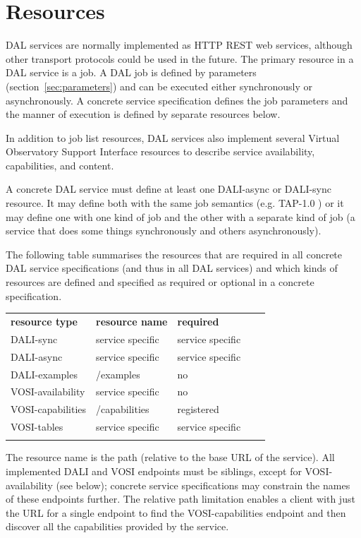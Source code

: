 \documentclass[11pt,letter]{ivoa}
\begin{document}
\section{Resources}
\label{sec:resources}
DAL services are normally implemented as HTTP REST \citep{fielding00} 
web services, although 
other transport protocols could be used in the future. The primary resource in 
a DAL service is a job. A DAL job is defined by parameters 
(section~\ref{sec:parameters}) and 
can be executed either synchronously or asynchronously. A concrete service 
specification defines the job parameters and the manner of execution is defined 
by separate resources below.

In addition to job list resources, DAL services also implement several Virtual 
Observatory Support Interface \citep{2017ivoa.spec.0524G} resources to describe 
service availability, capabilities, and content.

A concrete DAL service must define at least one DALI-async or DALI-sync 
resource. It may define both with the same job semantics (e.g. TAP-1.0 
\citep{2010ivoa.spec.0327D}) or it may define one with one kind of job and the other with a 
separate kind of job (a service that does some things synchronously and others 
asynchronously). 

The following table summarises the resources that are required in all concrete 
DAL service specifications (and thus in all DAL services) and which kinds of 
resources are defined and specified as required or optional in a concrete 
specification.


\begin{tabular}{l l l l l}
\sptablerule
\textbf{resource type} & \textbf{resource name} & \textbf{required} \\
\sptablerule
DALI-sync & service specific & service specific & \\
DALI-async & service specific & service specific & \\
DALI-examples & /examples & no & \\
VOSI-availability & service specific & no & \\
VOSI-capabilities & /capabilities & registered & \\
VOSI-tables & service specific & service specific & \\
\sptablerule
\label{tab:resources}
\end{tabular}

The resource name is the path (relative to the base URL of the service). All implemented
DALI and VOSI endpoints must be siblings, except for VOSI-availability (see below); 
concrete service specifications may constrain the names of these endpoints further.
The relative path limitation enables a client with just the URL for a single endpoint to 
find the VOSI-capabilities endpoint and then discover all the capabilities 
provided by the service. 
\end{document}
